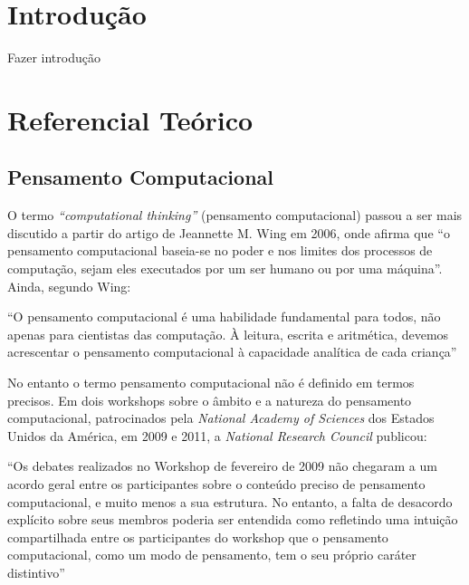 \documentclass[12pt, openright, a4paper, brazil, english, french, spanish, bibjustif, openany, oneside]{abntex2}
\begin{document}
\tableofcontents*
\cleardoublepage
\textual


\chapter*[Introdução]{Introdução}

Fazer introdução

\chapter{Referencial Teórico}

\section{Pensamento Computacional}

O termo \textit{``computational thinking''} (pensamento computacional) passou a ser mais discutido a partir do artigo de Jeannette M. Wing em 2006, onde afirma que ``o pensamento computacional baseia-se no poder e nos limites dos processos de computação, sejam eles executados por um ser humano ou por uma máquina''\cite{wing}. Ainda, segundo Wing:

\begin{citacao}

``O pensamento computacional é uma habilidade fundamental para todos, não apenas para cientistas das computação. À leitura, escrita e aritmética, devemos acrescentar o pensamento computacional à capacidade analítica de cada criança'' \cite{wing}

\end{citacao}




No entanto o termo pensamento computacional não é definido em termos precisos. Em dois workshops sobre o âmbito e a natureza do pensamento computacional, patrocinados pela \textit{National Academy of Sciences} dos Estados Unidos da América, em 2009 e 2011, a \textit{National Research Council} publicou:

\begin{citacao}

``Os debates realizados no Workshop de fevereiro de 2009 não chegaram a um acordo geral entre os participantes sobre o conteúdo preciso de pensamento computacional, e muito menos a sua estrutura. No entanto, a falta de desacordo explícito sobre seus membros poderia ser entendida como refletindo uma intuição compartilhada entre os participantes do workshop que o pensamento computacional, como um modo de pensamento, tem o seu próprio caráter distintivo'' \cite{NRC}

\end{citacao}
\end{document}
